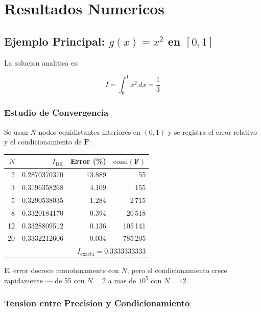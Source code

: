 \documentclass[12pt,a4paper]{article}
\begin{document}
\section{Resultados Numericos}

\subsection{Ejemplo Principal: $g(x) = x^2$ en $[0,1]$}

La solucion analitica es:

\begin{equation}
    I = \int_0^1 x^2\,dx = \frac{1}{3}
\end{equation}

\subsubsection{Estudio de Convergencia}

Se usan $N$ nodos equidistantes interiores en $(0,1)$ y se registra el
error relativo y el condicionamiento de $\mathbf{F}$:

\begin{center}
\begin{tabular}{rrrr}
\toprule
$N$ & $I_{\text{DR}}$ & Error (\%) & $\mathrm{cond}(\mathbf{F})$ \\
\midrule
 2 & 0.2870370370 & 13.889  &         55 \\
 3 & 0.3196358268 &  4.109  &        155 \\
 5 & 0.3290538035 &  1.284  &      2\,715 \\
 8 & 0.3320184170 &  0.394  &     20\,518 \\
12 & 0.3328809512 &  0.136  &    105\,141 \\
20 & 0.3332212606 &  0.034  &    785\,205 \\
\bottomrule
\multicolumn{4}{r}{$I_{\text{exacta}} = 0.3333333333$}
\end{tabular}
\end{center}

El error decrece monotonamente con $N$, pero el condicionamiento crece
rapidamente --- de 55 con $N=2$ a mas de $10^5$ con $N=12$.

\subsubsection{Tension entre Precision y Condicionamiento}
\end{document}
